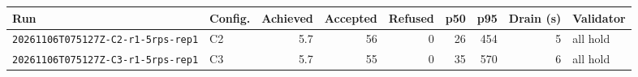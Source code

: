 \begin{tabular}{llrrrrrrl}
\toprule
Run & Config. & Achieved & Accepted & Refused & p50 & p95 & Drain (s) & Validator \\
\midrule
\nolinkurl{20261106T075127Z-C2-r1-5rps-rep1} & C2 & 5.7 & 56 & 0 & 26 & 454 & 5 & all hold \\
\nolinkurl{20261106T075127Z-C3-r1-5rps-rep1} & C3 & 5.7 & 55 & 0 & 35 & 570 & 6 & all hold \\
\bottomrule
\end{tabular}
